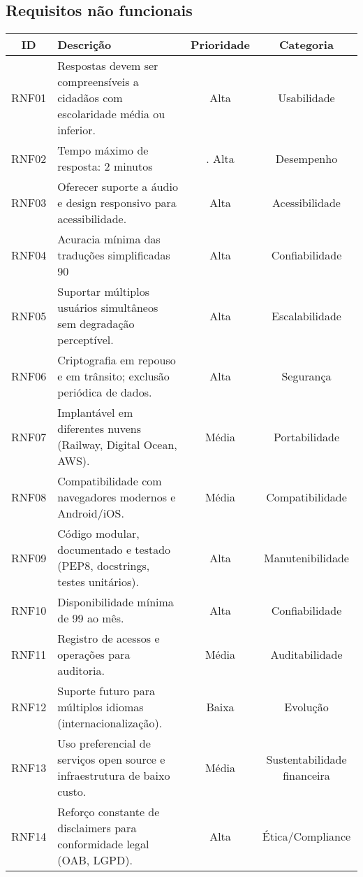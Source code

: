 \documentclass{article}
\begin{document}
\subsection*{Requisitos não funcionais}
\begin{tabular}{|c|p{7cm}|c|c|}
\hline
\textbf{ID} & \textbf{Descrição} & \textbf{Prioridade} & \textbf{Categoria} \\
\hline
RNF01&	Respostas devem ser compreensíveis a cidadãos com escolaridade média ou inferior.&	Alta&	Usabilidade\\\hline
RNF02& Tempo máximo de resposta: 2 minutos&.	Alta&	Desempenho\\\hline
RNF03&	Oferecer suporte a áudio e design responsivo para acessibilidade.&	Alta&	Acessibilidade\\\hline
RNF04&	Acuracia mínima das traduções simplificadas 90	&Alta &	Confiabilidade\\\hline
RNF05&	Suportar múltiplos usuários simultâneos sem degradação perceptível.&	Alta&	Escalabilidade\\\hline
RNF06&	Criptografia em repouso e em trânsito; exclusão periódica de dados.	&Alta&	Segurança\\\hline
RNF07&	Implantável em diferentes nuvens (Railway, Digital Ocean, AWS).	&Média	&Portabilidade\\\hline
RNF08&	Compatibilidade com navegadores modernos e Android/iOS.	&Média	&Compatibilidade\\\hline
RNF09&	Código modular, documentado e testado (PEP8, docstrings, testes unitários).&	Alta	&Manutenibilidade\\\hline
RNF10&	Disponibilidade mínima de 99 ao mês.	&Alta	&Confiabilidade\\\hline
RNF11&	Registro de acessos e operações para auditoria.	&Média	&Auditabilidade\\\hline
RNF12&	Suporte futuro para múltiplos idiomas (internacionalização).&	Baixa&	Evolução\\\hline
RNF13&	Uso preferencial de serviços open source e infraestrutura de baixo custo.&	Média&	Sustentabilidade financeira\\\hline
RNF14&	Reforço constante de disclaimers para conformidade legal (OAB, LGPD).&	Alta&	Ética/Compliance\\\hline
\end{tabular}
\end{document}
